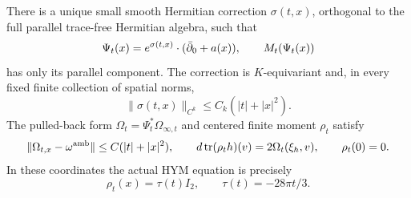 \begin{proposition}\label{prop:corrected-slice}
There is a unique small smooth Hermitian correction $\sigma(t,x)$,
orthogonal to the full parallel trace-free Hermitian algebra, such that
\[
\Psi_t(x)=e^{\sigma(t,x)}\cdot(\bar\partial_0+a(x)),\qquad
M_t(\Psi_t(x))
\]
has only its parallel component. The correction is $K$-equivariant and,
in every fixed finite collection of spatial norms,
\begin{equation}\label{eq:sigma-estimate}
\|\sigma(t,x)\|_{C^k}\le C_k(|t|+|x|^2).
\end{equation}
The pulled-back form $\Omega_t=\Psi_t^*\Omega_{\infty,t}$ and centered
finite moment $\rho_t$ satisfy
\begin{equation}\label{eq:form-error}
\|\Omega_{t,x}-\omega^{\rm amb}\|\le C(|t|+|x|^2),\qquad
d\operatorname{tr}(\rho_t h)(v)=2\Omega_t(\xi_h,v),\qquad \rho_t(0)=0.
\end{equation}
In these coordinates the actual HYM equation is precisely
\begin{equation}\label{eq:exact-real-equation}
\rho_t(x)=\tau(t)I_2,\qquad \tau(t)=-28\pi t/3.
\end{equation}
\end{proposition}


